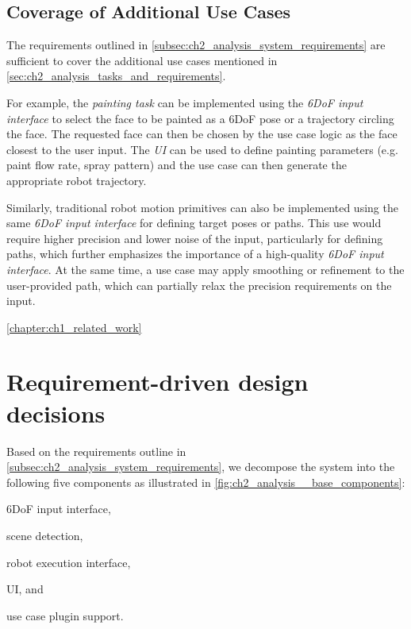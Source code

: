\subsection{Coverage of Additional Use Cases}

The requirements outlined in \autoref{subsec:ch2_analysis_system_requirements} are sufficient to cover the additional use cases mentioned in \autoref{sec:ch2_analysis_tasks_and_requirements}. 

For example, the \emph{painting task} can be implemented using the \emph{6DoF input interface} to select the face to be painted as a 6DoF pose or a trajectory circling the face. The requested face can then be chosen by the use case logic as the face closest to the user input. The \emph{UI} can be used to define painting parameters (e.g. paint flow rate, spray pattern) and the use case can then generate the appropriate robot trajectory.

Similarly, traditional robot motion primitives can also be implemented using the same \emph{6DoF input interface} for defining target poses or paths. This use would require higher precision and lower noise of the input, particularly for defining paths, which further emphasizes the importance of a high-quality \emph{6DoF input interface}. At the same time, a use case may apply smoothing or refinement to the user-provided path, which can partially relax the precision requirements on the input.

\DIFaddbegin {}\autoref{chapter:ch1_related_work}

\DIFaddend \section{Requirement-driven design decisions}

Based on the requirements outline in \autoref{subsec:ch2_analysis_system_requirements}, we decompose the system into the following five components as illustrated in \autoref{fig:ch2_analysis__base_components}:
\begin{enumerate*}[label=(\arabic*)]
    \item 6DoF input interface, 
    \item scene detection,
    \item robot execution interface,
    \item UI, and 
    \item use case plugin support.
\end{enumerate*}


